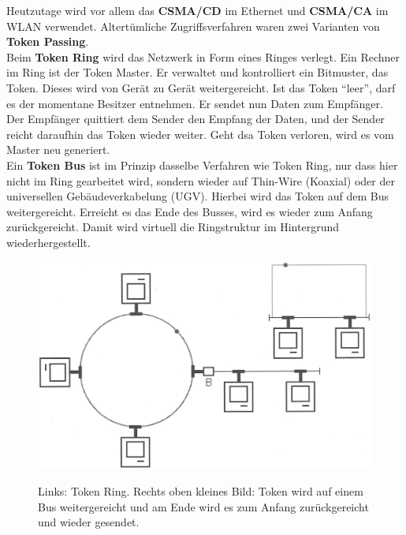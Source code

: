 Heutzutage wird vor allem das \textbf{CSMA/CD} im Ethernet und \textbf{CSMA/CA} im WLAN verwendet. Altertümliche Zugriffsverfahren waren zwei Varianten von \textbf{Token Passing}.\\[1em]
Beim \textbf{Token Ring} wird das Netzwerk in Form eines Ringes verlegt. Ein Rechner im Ring ist der Token Master. Er verwaltet und kontrolliert ein Bitmuster, das Token. Dieses wird von Gerät zu Gerät weitergereicht. Ist das Token "`leer"', darf es der momentane Besitzer entnehmen. Er sendet nun Daten zum Empfänger. Der Empfänger quittiert dem Sender den Empfang der Daten, und der Sender reicht daraufhin das Token wieder weiter. Geht dsa Token verloren, wird es vom Master neu generiert.\\[1em]
Ein \textbf{Token Bus} ist im Prinzip dasselbe Verfahren wie Token Ring, nur dass hier nicht im Ring gearbeitet wird, sondern wieder auf Thin-Wire (Koaxial) oder der universellen Gebäudeverkabelung (UGV). Hierbei wird das Token auf dem Bus weitergereicht. Erreicht es das Ende des Busses, wird es wieder zum Anfang zurückgereicht. Damit wird virtuell die Ringstruktur im Hintergrund wiederhergestellt\cite{Schreiner2019}.

\begin{figure}[H]
    \begin{center}
    \label{pic:Token}
    \includegraphics[width=\textwidth]{images/Token.jpg}
    \caption{Links: Token Ring. Rechts oben kleines Bild: Token wird auf einem Bus weitergereicht und am Ende wird es zum Anfang zurückgereicht und wieder gesendet.\cite{Schreiner2019}}
    \end{center}
\end{figure}

